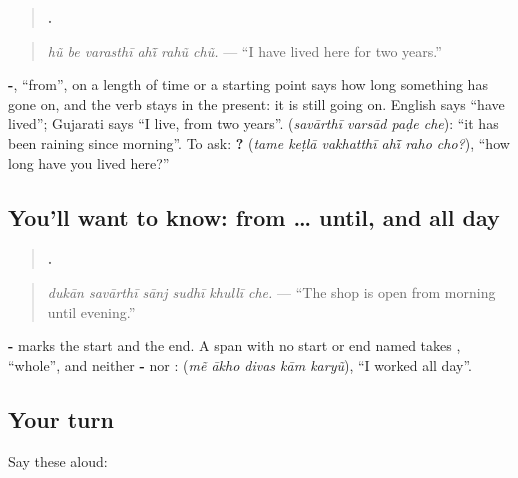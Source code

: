 \begin{grammarlens}[title={Grammar Lens: -\gu{થી} and the present}]
\begin{quote}
\textbf{     .}
\end{quote}

\begin{quote}
\emph{hũ be varasthī ahī̃ rahũ chũ.} — \textquotedblleft{}I have lived here for two years.\textquotedblright{}
\end{quote}

\textbf{-}, \textquotedblleft{}from\textquotedblright{}, on a length of time or a starting point says how long something has gone on, and the verb stays in the present: it is still going on. English says \textquotedblleft{}have lived\textquotedblright{}; Gujarati says \textquotedblleft{}I live, from two years\textquotedblright{}. \textbf{   } (\emph{savārthī varsād paḍe che}): \textquotedblleft{}it has been raining since morning\textquotedblright{}. To ask: \textbf{     ?} (\emph{tame keṭlā vakhatthī ahī̃ raho cho?}), \textquotedblleft{}how long have you lived here?\textquotedblright{}
\end{grammarlens}

\subsection*{You'll want to know: from … until, and all day}
\begin{quote}
\textbf{     .}
\end{quote}

\begin{quote}
\emph{dukān savārthī sānj sudhī khullī che.} — \textquotedblleft{}The shop is open from morning until evening.\textquotedblright{}
\end{quote}

\textbf{-} marks the start and \textbf{} the end. A span with no start or end named takes \textbf{}, \textquotedblleft{}whole\textquotedblright{}, and neither \textbf{-} nor \textbf{}: \textbf{    } (\emph{mẽ ākho divas kām karyũ}), \textquotedblleft{}I worked all day\textquotedblright{}.

\subsection*{Your turn}
Say these aloud:

